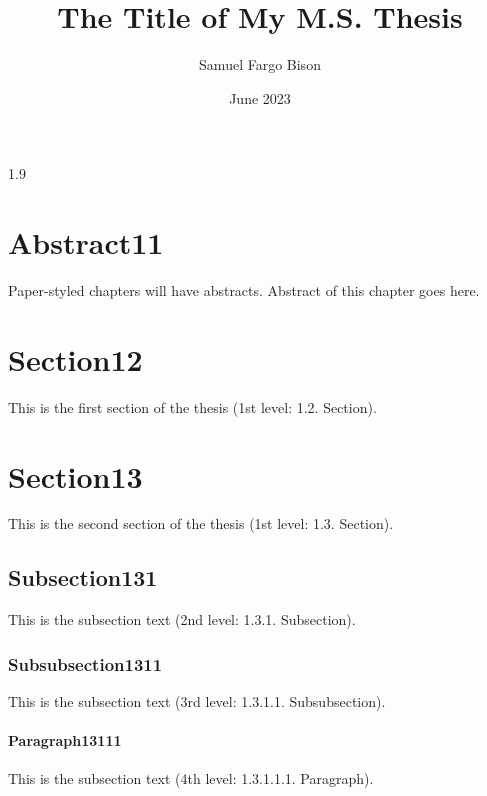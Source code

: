 \documentclass[ms-thesis,12pt,chapterrefs]{ndsu-thesis-2022}
\title{The Title of My M.S. Thesis}
\author{Samuel Fargo Bison}
\date{June 2023}
\newcommand\myspacing{1.9} %
\begin{document}
\begin{spacing}{\myspacing}      %


\section{Abstract11}
Paper-styled chapters will have abstracts. Abstract of this chapter goes here. \kant[1]

\section{Section12}
This is the first section of the thesis (1st level: 1.2. Section). \kant[2]

\section{Section13}
This is the second section of the thesis (1st level: 1.3. Section). \kant[3]

\subsection{Subsection131}
This is the subsection text (2nd level: 1.3.1. Subsection). \kant[4]

\subsubsection{Subsubsection1311}
This is the subsection text (3rd level: 1.3.1.1. Subsubsection). \kant[5]

\paragraph{Paragraph13111}
This is the subsection text (4th level: 1.3.1.1.1. Paragraph). \kant[6]


\end{spacing}
\end{document}
